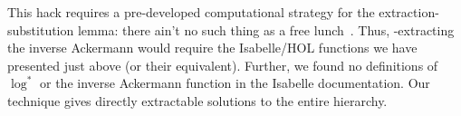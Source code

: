 \noindent This hack requires a pre-developed computational strategy 
for the \li{[code]} extraction-substitution lemma: there ain't no such thing 
as a free lunch~\cite{moonmistress}. Thus, \li{[code]}-extracting the inverse 
Ackermann would require the Isabelle/HOL functions we have presented 
just above (or their equivalent). Further, we found no definitions of $\log^*$ 
or the inverse Ackermann function in the Isabelle documentation. Our technique 
gives directly extractable solutions to the entire hierarchy.
\lstset{style=myStyle}

